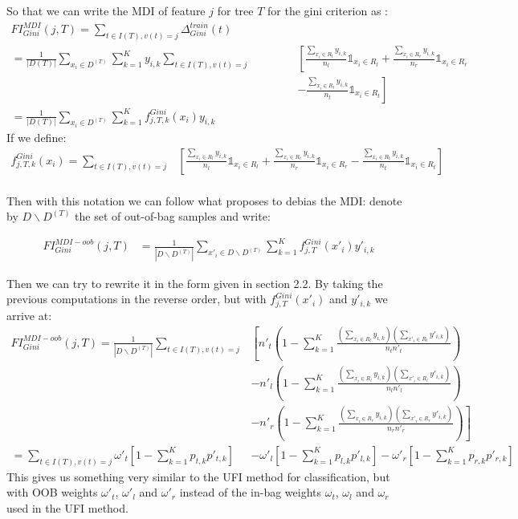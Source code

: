 \documentclass{article}
\begin{document}
So that we can write the MDI of feature $j$ for tree $T$ for the gini criterion as :
\begin{align*}
    FI_{Gini}^{MDI}(j, T) = \sum_{t \in I(T), v(t)=j} \Delta_{Gini}^{train}(t) \quad \quad  \quad \quad \quad \left.\right.\left.\right.\left.\right. \\
    = \frac{1}{|D(T)|} \sum_{x_i \in D^{(T)}} \sum_{k=1}^K y_{i,k} \sum_{t \in I(T), v(t)=j} & \left[ \frac{\sum_{x_i \in R_l} y_{i,k}}{n_l} \mathds{1}_{x_i \in R_l} + \frac{\sum_{x_i \in R_r} y_{i,k}}{n_r} \mathds{1}_{x_i \in R_r} \right. \\ 
    &\left. - \frac{\sum_{x_i \in R_t} y_{i,k}}{n_t} \mathds{1}_{x_i \in R_t} \right] \\
    = \frac{1}{|D(T)|} \sum_{x_i \in D^{(T)}} \sum_{k=1}^K f_{j, T, k}^{Gini} (x_i) y_{i,k}
\end{align*}
If we define:
\begin{align*}
    f_{j, T, k}^{Gini}(x_i) = \sum_{t \in I(T), v(t)=j} & \left[ \frac{\sum_{x_i \in R_l} y_{i,k}}{n_l} \mathds{1}_{x_i \in R_l}  + \frac{\sum_{x_i \in R_r} y_{i,k}}{n_r} \mathds{1}_{x_i \in R_r} - \frac{\sum_{x_i \in R_t} y_{i,k}}{n_t} \mathds{1}_{x_i \in R_t} \right] \\
\end{align*}

Then with this notation we can follow what \cite{MDI-oob} proposes to debias the MDI: denote by $D \backslash D^{(T)}$ the set of out-of-bag samples and write: 

\begin{align*}
    FI_{Gini}^{MDI-oob}(j, T) &= \frac{1}{|D \backslash D^{(T)}|} \sum_{x'_i \in D \backslash D^{(T)}} \sum_{k=1}^K f_{j,T}^{Gini}(x'_i) y'_{i,k}
\end{align*}

Then we can try to rewrite it in the form given in section 2.2. By taking the previous computations in the reverse order, but with $f_{j,T}^{Gini}(x'_i) $ and $ y'_{i,k}$ we arrive at: 
\begin{align*}
    FI_{Gini}^{MDI-oob}(j, T) =  \frac{1}{|D \backslash D^{(T)}|} \sum_{t \in I(T), v(t)=j}&\left[ n'_t\left(1 - \sum_{k=1}^K\frac{\left(\sum_{x_i \in R_t} y_{i,k}\right)\left(\sum_{x'_i \in R_t} y'_{i,k}\right)}{n_t n'_t} \right) \right. \\
    & \left. - n'_l\left( 1 - \sum_{k=1}^K \frac{ \left( \sum_{x_i \in R_l} y_{i,k} \right) \left( \sum_{x'_i \in R_l} y'_{i,k} \right) }{n_l n'_l} \right) \right. \\
    & \left. - n'_r\left( 1 - \sum_{k=1}^K \frac{\left(\sum_{x_i \in R_r} y_{i,k}\right) \left(\sum_{x'_i \in R_r} y'_{i,k}\right)}{n_r n'_r} \right) \right] \\
    = \sum_{t \in I(T), v(t)=j} \omega'_t \left[1 - \sum_{k = 1}^K p_{t,k}p'_{t,k}\right]& - \omega'_{l} \left[1 - \sum_{k = 1}^K p_{l,k}p'_{l,k}\right] - \omega'_{r} \left[1 - \sum_{k = 1}^K p_{r,k}p'_{r,k}\right]
\end{align*}
This gives us something very similar to the UFI method for classification, but with OOB weights $\omega'_t$, $\omega'_l$ and $\omega'_r$ instead of the in-bag weights $\omega_t$, $\omega_l$ and $\omega_r$ used in the UFI method.
\end{document}
